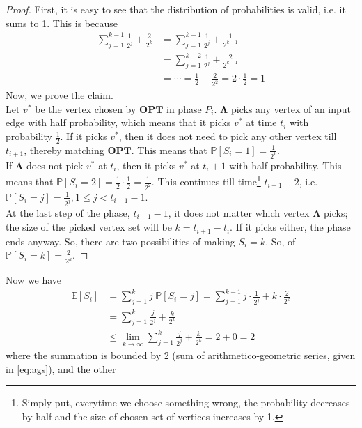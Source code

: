 \documentclass[11pt]{article}
\begin{document}
\begin{proof}
    First, it is easy to see that the distribution of probabilities is valid, i.e. it sums to 1.
    This is because
    \begin{align}
        \sum_{j=1}^{k-1} \frac{1}{2^{j}} + \frac{2}{2^{k}} &= \sum_{j=1}^{k-1} \frac{1}{2^{j}} + \frac{1}{2^{k-1}} \\
        &= \sum_{j=1}^{k-2} \frac{1}{2^{j}} + \frac{2}{2^{k-1}} \\
        &= \cdots = \frac{1}{2} + \frac{2}{2^{2}} = 2 \cdot \frac{1}{2} = 1
    \end{align}
    Now, we prove the claim. \\
    Let $v^{*}$ be the vertex chosen by $\mathbf{OPT}$ in phase $P_{i}$. $\mathbf{\Lambda}$ picks
    any vertex of an input edge with half probability, which means that it picks $v^{*}$ at time
    $t_{i}$ with probability $\frac{1}{2}$. If it picks $v^{*}$, then it does not need to pick any other
    vertex till $t_{i+1}$, thereby matching $\mathbf{OPT}$. This means that $\mathbb{P}[S_{i} = 1] = \frac{1}{2^{1}}$. \\
    If $\mathbf{\Lambda}$ does not pick $v^{*}$ at $t_{i}$, then it picks $v^{*}$ at $t_{i} + 1$
    with half probability. This means that $\mathbb{P}[S_{i} = 2] = \frac{1}{2} \cdot \frac{1}{2} = \frac{1}{2^{2}}$.
    This continues till time\footnote{Simply put, everytime we choose something wrong, the probability
    decreases by half and the size of chosen set of vertices increases by 1.} $t_{i+1} - 2$, i.e. $\mathbb{P}[S_{i} = j] = \frac{1}{2^{j}}, 1 \leq j < t_{i+1} - 1$. \\
    At the last step of the phase, $t_{i+1} - 1$, it does not matter which vertex $\mathbf{\Lambda}$ picks; the size of
    the picked vertex set will be $k = t_{i+1} - t_{i} $. If it picks
    either, the phase ends anyway. So, there are two possibilities of making $S_{i} = k$. So,
    of $\mathbb{P}[S_{i} = k] = \frac{2}{2^{k}}$.
\end{proof}
Now we have
\begin{align}
    \mathbb{E}[S_{i}] &= \sum_{j=1}^{k} j \ \mathbb{P}[S_{i} = j] = \sum_{j=1}^{k-1} j \cdot \frac{1}{2^{j}} + k \cdot \frac{2}{2^{k}} \\
    &= \sum_{j=1}^{k} \frac{j}{2^{j}} + \frac{k}{2^{k}} \\
    &\leq \lim_{k \to \infty} \sum_{j=1}^{k} \frac{j}{2^{j}} + \frac{k}{2^{k}} = 2 + 0 = 2
\end{align}
where the summation is bounded by 2 (sum of arithmetico-geometric series, given in \eqref{eq:ags}), and the other
\end{document}
